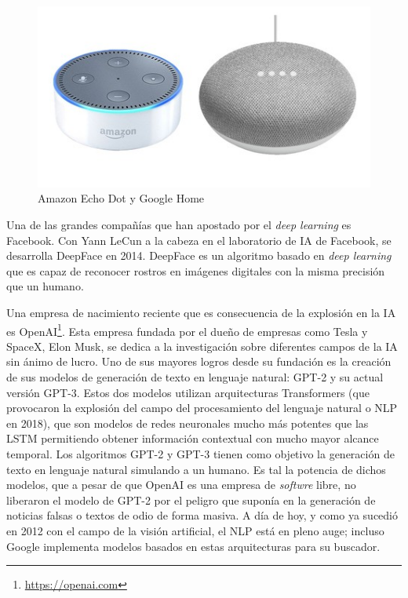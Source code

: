 \begin{figure}
  \centering
  \includegraphics[width=.9\linewidth]{img/homeecho.jpg}
  \caption{Amazon Echo Dot y Google Home}
  \label{fig:homeecho}
\end{figure}


Una de las grandes compañías que han apostado por el \textit{deep learning} es Facebook. Con Yann LeCun a la cabeza en el laboratorio de IA de Facebook, se desarrolla DeepFace \cite{deepface} en 2014. DeepFace es un algoritmo basado en \textit{deep learning} que es capaz de reconocer rostros en imágenes digitales con la misma precisión que un humano.

Una empresa de nacimiento reciente que es consecuencia de la explosión en la IA es OpenAI\footnote{\url{https://openai.com}}. Esta empresa fundada por el dueño de empresas como Tesla y SpaceX, Elon Musk, se dedica a la investigación sobre diferentes campos de la IA sin ánimo de lucro. Uno de sus mayores logros desde su fundación es la creación de sus modelos de generación de texto en lenguaje natural: GPT-2 y su actual versión GPT-3. Estos dos modelos utilizan arquitecturas Transformers (que provocaron la explosión del campo del procesamiento del lenguaje natural o NLP en 2018), que son modelos de redes neuronales mucho más potentes que las LSTM permitiendo obtener información contextual con mucho mayor alcance temporal. Los algoritmos GPT-2 y GPT-3 tienen como objetivo la generación de texto en lenguaje natural simulando a un humano. Es tal la potencia de dichos modelos, que a pesar de que OpenAI es una empresa de \textit{softwre} libre, no liberaron el modelo de GPT-2 por el peligro que suponía en la generación de noticias falsas o textos de odio de forma masiva. A día de hoy, y como ya sucedió en 2012 con el campo de la visión artificial, el NLP está en pleno auge; incluso Google implementa modelos basados en estas arquitecturas para su buscador.

